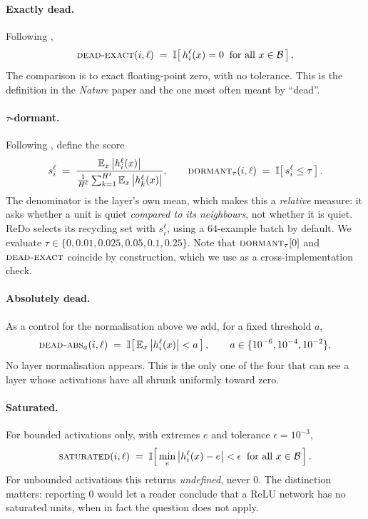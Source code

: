 \documentclass[10pt]{article}
\newcommand{\dexact}{\textsc{dead-exact}}
\newcommand{\ddorm}{\textsc{dormant}_\tau}
\newcommand{\dabs}{\textsc{dead-abs}_a}
\newcommand{\dsat}{\textsc{saturated}}
\begin{document}
\paragraph{Exactly dead.} Following \citet{dohare2024loss},
\begin{equation}
\dexact(i,\ell) \;=\; \mathbb{I}\!\left[\, h^\ell_i(x) = 0 \;\;\text{for all } x \in \mathcal{B} \,\right].
\end{equation}
The comparison is to exact floating-point zero, with no tolerance. This is the
definition in the \emph{Nature} paper and the one most often meant by ``dead''.

\paragraph{$\tau$-dormant.} Following \citet{sokar2023dormant}, define the score
\begin{equation}
s^\ell_i \;=\; \frac{\mathbb{E}_{x}\left|h^\ell_i(x)\right|}
                    {\frac{1}{H^\ell}\sum_{k=1}^{H^\ell} \mathbb{E}_{x}\left|h^\ell_k(x)\right|},
\qquad
\ddorm(i,\ell) \;=\; \mathbb{I}\!\left[\, s^\ell_i \le \tau \,\right].
\end{equation}
The denominator is the layer's own mean, which makes this a \emph{relative}
measure: it asks whether a unit is quiet \emph{compared to its neighbours}, not
whether it is quiet. ReDo selects its recycling set with $s^\ell_i$, using a
$64$-example batch by default. We evaluate
$\tau \in \{0, 0.01, 0.025, 0.05, 0.1, 0.25\}$. Note that $\ddorm[0]$ and
$\dexact$ coincide by construction, which we use as a cross-implementation
check.

\paragraph{Absolutely dead.} As a control for the normalisation above we add, for
a fixed threshold $a$,
\begin{equation}
\dabs(i,\ell) \;=\; \mathbb{I}\!\left[\, \mathbb{E}_{x}\left|h^\ell_i(x)\right| < a \,\right],
\qquad a \in \{10^{-6}, 10^{-4}, 10^{-2}\}.
\end{equation}
No layer normalisation appears. This is the only one of the four that can see a
layer whose activations have all shrunk uniformly toward zero.

\paragraph{Saturated.} For bounded activations only, with extremes $e$ and
tolerance $\epsilon = 10^{-3}$,
\begin{equation}
\dsat(i,\ell) \;=\; \mathbb{I}\!\left[\, \min_{e}\left|h^\ell_i(x) - e\right| < \epsilon
\;\;\text{for all } x \in \mathcal{B} \,\right].
\end{equation}
For unbounded activations this returns \emph{undefined}, never $0$. The
distinction matters: reporting $0$ would let a reader conclude that a ReLU
network has no saturated units, when in fact the question does not apply.
\end{document}
